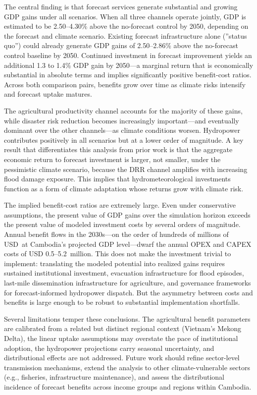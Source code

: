 \documentclass[
  final,
  10pt,
  letterpaper,
  english,
]{article}
\begin{document}
The central finding is that forecast services generate substantial and growing
GDP gains under all scenarios. When all three channels operate jointly, GDP is
estimated to be 2.50--4.30\% above the no-forecast control by 2050, depending on
the forecast and climate scenario. Existing forecast infrastructure alone
(''status quo'') could already generate GDP gains of 2.50--2.86\% above the
no-forecast control baseline by 2050. Continued investment in forecast
improvement yields an additional 1.3 to 1.4\% GDP gain by 2050—a marginal return
that is economically substantial in absolute terms and implies significantly
positive benefit-cost ratios. Across both comparison pairs, benefits grow over
time as climate risks intensify and forecast uptake matures.

The agricultural productivity channel
accounts for the majority of these gains, while disaster risk reduction becomes
increasingly important---and eventually dominant over the other channels---as
climate conditions worsen. Hydropower contributes positively in all scenarios
but at a lower order of magnitude. A key result that differentiates this
analysis from prior work is that the aggregate economic return to forecast
investment is larger, not smaller, under the pessimistic climate scenario,
because the DRR channel amplifies with increasing flood damage exposure. This
implies that hydrometeorological investments function as a form of climate
adaptation whose returns grow with climate risk.

The implied benefit-cost ratios are extremely large. Even under conservative
assumptions, the present value of GDP gains over the simulation horizon exceeds
the present value of modeled investment costs by several orders of magnitude.
Annual benefit flows in the 2030s---on the order of hundreds of millions of USD~at
Cambodia's projected GDP level---dwarf the annual OPEX and CAPEX costs of USD
0.5--5.2~million. This does not make the investment trivial to implement:
translating the modeled potential into realized gains requires sustained
institutional investment, evacuation infrastructure for flood episodes,
last-mile dissemination infrastructure for agriculture, and governance
frameworks for forecast-informed hydropower dispatch. But the asymmetry between
costs and benefits is large enough to be robust to substantial implementation
shortfalls.

Several limitations temper these conclusions. The agricultural benefit
parameters are calibrated from a related but distinct regional context
(Vietnam's Mekong Delta), the linear uptake assumptions may overstate the pace
of institutional adoption, the hydropower projections carry seasonal
uncertainty, and distributional effects are not addressed. Future work should
refine sector-level transmission mechanisms, extend the analysis to other
climate-vulnerable sectors (e.g., fisheries, infrastructure maintenance), and
assess the distributional incidence of forecast benefits across income groups
and regions within Cambodia.
\end{document}
